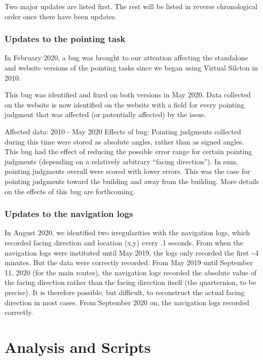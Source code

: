 \documentclass[
  12pt,
]{book}
\begin{document}
Two major updates are listed first. The rest will be listed in reverse chronological order once there have been updates.

\hypertarget{updates-to-the-pointing-task}{%
\section{Updates to the pointing task}\label{updates-to-the-pointing-task}}

In February 2020, a bug was brought to our attention affecting the standalone and website versions of the pointing tasks since we began using Virtual Silcton in 2010.

This bug was identified and fixed on both versions in May 2020. Data collected on the website is now identified on the website with a field for every pointing judgment that was affected (or potentially affected) by the issue.

Affected data: 2010 - May 2020
Effects of bug: Pointing judgments collected during this time were stored as absolute angles, rather than as signed angles. This bug had the effect of reducing the possible error range for certain pointing judgments (depending on a relatively arbitrary ``facing direction''). In sum, pointing judgments overall were scored with lower errors. This was the case for pointing judgments toward the building and away from the building. More details on the effects of this bug are forthcoming.

\hypertarget{updates-to-the-navigation-logs}{%
\section{Updates to the navigation logs}\label{updates-to-the-navigation-logs}}

In August 2020, we identified two irregularities with the navigation logs, which recorded facing direction and location (x,y) every .1 seconds. From when the navigation logs were instituted until May 2019, the logs only recorded the first \textasciitilde4 minutes. But the data were correctly recorded. From May 2019 until September 11, 2020 (for the main routes), the navigation logs recorded the absolute value of the facing direction rather than the facing direction itself (the quarternion, to be precise). It is therefore possible, but difficult, to reconstruct the actual facing direction in most cases. From September 2020 on, the navigation logs recorded correctly.

\hypertarget{part-analysis-and-scripts}{%
\part{Analysis and Scripts}\label{part-analysis-and-scripts}}
\end{document}

